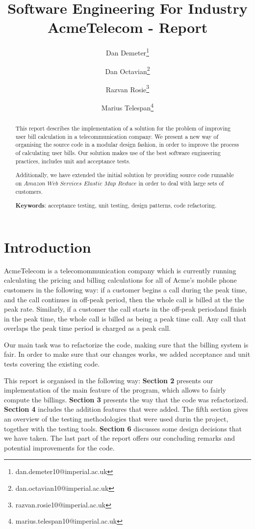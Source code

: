 \documentclass[11pt,twocolumn]{article} %
\title{Software Engineering For Industry \\ AcmeTelecom - Report}
\author[1]{Dan Demeter\thanks{dan.demeter10@imperial.ac.uk}}
\author[1]{Dan Octavian\thanks{dan.octavian10@imperial.ac.uk}}
\author[1]{Razvan Rosie\thanks{razvan.rosie10@imperial.ac.uk}}
\author[1]{Marius Telespan\thanks{marius.telespan10@imperial.ac.uk}}
\affil[1]{Department of Computing, Imperial College London}
\begin{document}
\maketitle

\begin{abstract}
This report describes the implementation of a solution for the problem of improving user bill calculation in a telecommunication company. 
We present a new way of organising the source code in a modular design fashion, in order to improve the process of calculating user bills. Our solution makes use of the best software engineering practices, includes unit and acceptance tests.

Additionally, we have extended the initial solution by providing source code runnable on $Amazon$ $Web$ $Services$ $Elastic$ $Map$ $Reduce$ in order to deal with large sets of customers.
\newline

{\bf Keywords}: acceptance testing, unit testing, design patterns, code refactoring.
\end{abstract}


\section{Introduction}
AcmeTelecom is a telecomommunication company which is currently running calculating the pricing and billing calculations
for all of Acme's mobile phone customers in the following way: if a customer begins a call during the peak time, and the call 
continues in off-peak period, then the whole call is billed at the the peak rate. Similarly, if a customer the call starts in 
the off-peak periodand finish in the peak time, the whole call is billed as being a peak time call. Any call that overlaps the 
peak time period is charged as a peak call.


Our main task was to refactorize the code, making sure that the billing system is fair. In order to make sure that our changes works,
we added acceptance and unit tests covering the existing code.

This report is organised in the following way: {\bf Section 2} presents our implementation of the main feature of the program, which
allows to fairly compute the billings. {\bf Section 3} presents the way that the code was refactorized. 
{\bf Section 4} includes the addition features that were added. 
The fifth section gives an overview of the testing methodologies that were used durin the project, together with the testing tools.
{\bf Section 6} discusses some design decisions that we have taken.
The last part of the report offers our concluding remarks and potential improvements for the code.
\end{document}
